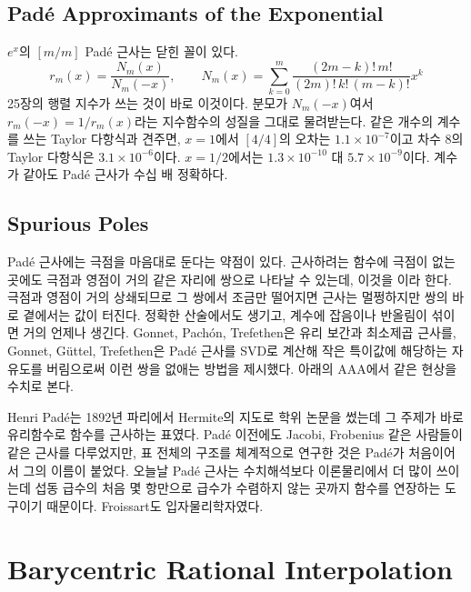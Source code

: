 \subsection{Padé Approximants of the Exponential}

$e^x$의 $[m/m]$ Padé 근사는 닫힌 꼴이 있다.
\[
r_m(x)=\frac{N_m(x)}{N_m(-x)},\qquad N_m(x)=\sum_{k=0}^m\frac{(2m-k)!\,m!}{(2m)!\,k!\,(m-k)!}x^k
\]
25장의 행렬 지수가 쓰는 것이 바로 이것이다. 분모가 $N_m(-x)$여서 $r_m(-x)=1/r_m(x)$라는 지수함수의 성질을 그대로 물려받는다. 같은 개수의 계수를 쓰는 Taylor 다항식과 견주면, $x=1$에서 $[4/4]$의 오차는 $1.1\times10^{-7}$이고 차수 $8$의 Taylor 다항식은 $3.1\times10^{-6}$이다. $x=1/2$에서는 $1.3\times10^{-10}$ 대 $5.7\times10^{-9}$이다. 계수가 같아도 Padé 근사가 수십 배 정확하다.

\subsection{Spurious Poles}

Padé 근사에는 극점을 마음대로 둔다는 약점이 있다. 근사하려는 함수에 극점이 없는 곳에도 극점과 영점이 거의 같은 자리에 쌍으로 나타날 수 있는데, 이것을 이라 한다\cite{froissart1969}. 극점과 영점이 거의 상쇄되므로 그 쌍에서 조금만 떨어지면 근사는 멀쩡하지만 쌍의 바로 곁에서는 값이 터진다. 정확한 산술에서도 생기고, 계수에 잡음이나 반올림이 섞이면 거의 언제나 생긴다. Gonnet, Pachón, Trefethen은 유리 보간과 최소제곱 근사를, Gonnet, Güttel, Trefethen은 Padé 근사를 SVD로 계산해 작은 특이값에 해당하는 자유도를 버림으로써 이런 쌍을 없애는 방법을 제시했다\cite{gonnet2011robust,gonnet2013pade}. 아래의 AAA에서 같은 현상을 수치로 본다.

\begin{aside}[Padé의 학위 논문]
Henri Padé는 1892년 파리에서 Hermite의 지도로 학위 논문을 썼는데 그 주제가 바로 유리함수로 함수를 근사하는 표였다\cite{pade1892}. Padé 이전에도 Jacobi, Frobenius 같은 사람들이 같은 근사를 다루었지만, 표 전체의 구조를 체계적으로 연구한 것은 Padé가 처음이어서 그의 이름이 붙었다. 오늘날 Padé 근사는 수치해석보다 이론물리에서 더 많이 쓰이는데 섭동 급수의 처음 몇 항만으로 급수가 수렴하지 않는 곳까지 함수를 연장하는 도구이기 때문이다. Froissart도 입자물리학자였다.
\end{aside}

\section{Barycentric Rational Interpolation}
\label{sec:bary-rational}

